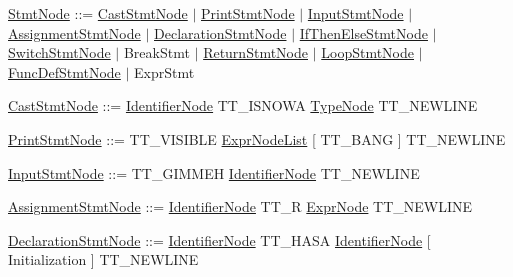\begin{DoxyParagraph}{}
\hyperlink{struct_stmt_node}{Stmt\-Node} \-:\-:= \hyperlink{struct_cast_stmt_node}{Cast\-Stmt\-Node} $|$ \hyperlink{struct_print_stmt_node}{Print\-Stmt\-Node} $|$ \hyperlink{struct_input_stmt_node}{Input\-Stmt\-Node} $|$ \hyperlink{struct_assignment_stmt_node}{Assignment\-Stmt\-Node} $|$ \hyperlink{struct_declaration_stmt_node}{Declaration\-Stmt\-Node} $|$ \hyperlink{struct_if_then_else_stmt_node}{If\-Then\-Else\-Stmt\-Node} $|$ \hyperlink{struct_switch_stmt_node}{Switch\-Stmt\-Node} $|$ Break\-Stmt $|$ \hyperlink{struct_return_stmt_node}{Return\-Stmt\-Node} $|$ \hyperlink{struct_loop_stmt_node}{Loop\-Stmt\-Node} $|$ \hyperlink{struct_func_def_stmt_node}{Func\-Def\-Stmt\-Node} $|$ Expr\-Stmt
\end{DoxyParagraph}
\begin{DoxyParagraph}{}
\hyperlink{struct_cast_stmt_node}{Cast\-Stmt\-Node} \-:\-:= \hyperlink{struct_identifier_node}{Identifier\-Node} {\ttfamily T\-T\-\_\-\-I\-S\-N\-O\-W\-A} \hyperlink{struct_type_node}{Type\-Node} {\ttfamily T\-T\-\_\-\-N\-E\-W\-L\-I\-N\-E} 
\end{DoxyParagraph}
\begin{DoxyParagraph}{}
\hyperlink{struct_print_stmt_node}{Print\-Stmt\-Node} \-:\-:= {\ttfamily T\-T\-\_\-\-V\-I\-S\-I\-B\-L\-E} \hyperlink{struct_expr_node_list}{Expr\-Node\-List} {\ttfamily }\mbox{[} {\ttfamily T\-T\-\_\-\-B\-A\-N\-G} \mbox{]} T\-T\-\_\-\-N\-E\-W\-L\-I\-N\-E
\end{DoxyParagraph}
\begin{DoxyParagraph}{}
\hyperlink{struct_input_stmt_node}{Input\-Stmt\-Node} \-:\-:= {\ttfamily T\-T\-\_\-\-G\-I\-M\-M\-E\-H} \hyperlink{struct_identifier_node}{Identifier\-Node} T\-T\-\_\-\-N\-E\-W\-L\-I\-N\-E
\end{DoxyParagraph}
\begin{DoxyParagraph}{}
\hyperlink{struct_assignment_stmt_node}{Assignment\-Stmt\-Node} \-:\-:= \hyperlink{struct_identifier_node}{Identifier\-Node} {\ttfamily T\-T\-\_\-\-R} \hyperlink{struct_expr_node}{Expr\-Node} {\ttfamily T\-T\-\_\-\-N\-E\-W\-L\-I\-N\-E} 
\end{DoxyParagraph}
\begin{DoxyParagraph}{}
\hyperlink{struct_declaration_stmt_node}{Declaration\-Stmt\-Node} \-:\-:= \hyperlink{struct_identifier_node}{Identifier\-Node} {\ttfamily T\-T\-\_\-\-H\-A\-S\-A} \hyperlink{struct_identifier_node}{Identifier\-Node} \mbox{[} Initialization \mbox{]} {\ttfamily T\-T\-\_\-\-N\-E\-W\-L\-I\-N\-E} 
\end{DoxyParagraph}
